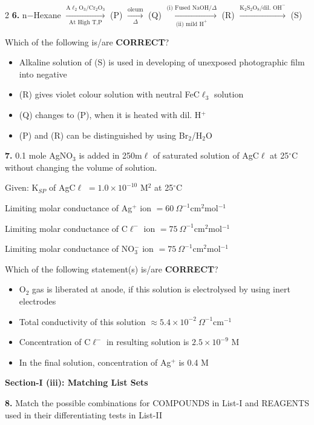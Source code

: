 \documentclass[10pt]{extarticle}
\newenvironment{qoptions}{\begin{itemize}[leftmargin=1.8em,itemsep=2pt,topsep=2pt,label={}]}{\end{itemize}}
\newcommand{\opt}[2]{\item[({#1})] {#2}}
\newcommand{\subsectionhdr}[1]{\par\vspace{3pt}\noindent\textbf{#1}\par\vspace{2pt}}
\begin{document}
\begin{multicols}{2}
\textbf{6.} n$-$Hexane $\xrightarrow[\text{At High T,P}]{\text{A}\ell_2\text{O}_3/\text{Cr}_2\text{O}_3}$ (P) $\xrightarrow[\Delta]{\text{oleum}}$ (Q) $\xrightarrow[\text{(ii) mild H}^+]{\text{(i) Fused NaOH}/\Delta}$ (R) $\xrightarrow{\text{K}_2\text{S}_2\text{O}_8/\text{dil. OH}^-}$ (S)

Which of the following is/are \textbf{CORRECT}?

\begin{qoptions}
\opt{A}{Alkaline solution of (S) is used in developing of unexposed photographic film into negative}
\opt{B}{(R) gives violet colour solution with neutral FeC$\ell_3$ solution}
\opt{C}{(Q) changes to (P), when it is heated with dil. H$^+$}
\opt{D}{(P) and (R) can be distinguished by using Br$_2$/H$_2$O}
\end{qoptions}

\textbf{7.} 0.1 mole AgNO$_3$ is added in 250m$\ell$ of saturated solution of AgC$\ell$ at 25$^\circ$C without changing the volume of solution.

Given: K$_{SP}$ of AgC$\ell$ $=1.0\times10^{-10}$ M$^2$ at 25$^\circ$C

Limiting molar conductance of Ag$^+$ ion $=60\ \Omega^{-1}$cm$^2$mol$^{-1}$

Limiting molar conductance of C$\ell^-$ ion $=75\ \Omega^{-1}$cm$^2$mol$^{-1}$

Limiting molar conductance of NO$_3^-$ ion $=75\ \Omega^{-1}$cm$^2$mol$^{-1}$

Which of the following statement(s) is/are \textbf{CORRECT}?

\begin{qoptions}
\opt{A}{O$_2$ gas is liberated at anode, if this solution is electrolysed by using inert electrodes}
\opt{B}{Total conductivity of this solution $\approx5.4\times10^{-2}\ \Omega^{-1}$cm$^{-1}$}
\opt{C}{Concentration of C$\ell^-$ in resulting solution is $2.5\times10^{-9}$ M}
\opt{D}{In the final solution, concentration of Ag$^+$ is 0.4 M}
\end{qoptions}

\subsectionhdr{Section-I (iii): Matching List Sets}

\textbf{8.} Match the possible combinations for COMPOUNDS in List-I and REAGENTS used in their differentiating tests in List-II

\end{multicols}
\end{document}
